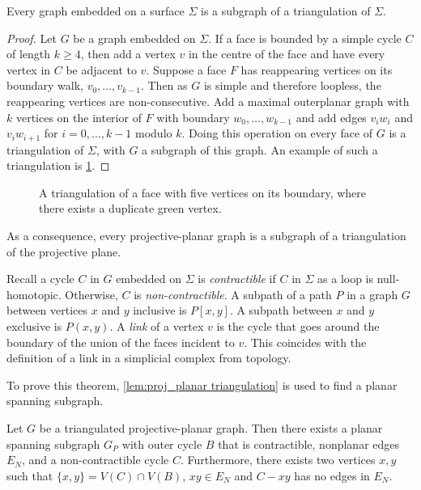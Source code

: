 \begin{theorem}\label{thm:triangulation_subgraph}
    Every graph embedded on a surface $\Sigma$ is a subgraph of a triangulation of $\Sigma$.
\end{theorem}

\begin{proof}
    Let $G$ be a graph embedded on $\Sigma$. If a face is bounded by a simple cycle $C$ of length $k \geq 4$, then add a vertex $v$ in the centre of the face and have every vertex in $C$ be adjacent to $v$. Suppose a face $F$ has reappearing vertices on its boundary walk, $v_0, \ldots, v_{k-1}$. Then as $G$ is simple and therefore loopless, the reappearing vertices are non-consecutive. Add a maximal outerplanar graph with $k$ vertices on the interior of $F$ with boundary $w_0, \ldots, w_{k-1}$ and add edges $v_i w_i$ and $v_i w_{i + 1}$ for $i = 0, \ldots, {k-1}$ modulo $k$. Doing this operation on every face of $G$ is a triangulation of $\Sigma$, with $G$ a subgraph of this graph. An example of such a triangulation is \cref{fig:triangulation}.
\end{proof}
\begin{figure}[h!]
    \centering
    
    \caption[Face triangulation]{A triangulation of a face with five vertices on its boundary, where there exists a duplicate green vertex.}\label{fig:triangulation}
\end{figure}
As a consequence, every projective-planar graph is a subgraph of a triangulation of the projective plane. 

Recall a cycle $C$ in $G$ embedded on $\Sigma$ is \textit{contractible} if $C$ in $\Sigma$ as a loop is null-homotopic. Otherwise, $C$ is \textit{ non-contractible}. A subpath of a path $P$ in a graph $G$ between vertices $x$ and $y$ inclusive is $P[x, y]$. A subpath between $x$ and $y$ exclusive is $P(x, y)$. 
A \textit{link} of a vertex $v$ is the cycle that goes around the boundary of the union of the faces incident to $v$. This coincides with the definition of a link in a simplicial complex from topology. 

To prove this theorem, \cref{lem:proj_planar triangulation} is used to find a planar spanning subgraph.

\begin{lemma}\label{lem:proj_planar triangulation}
    Let $G$ be a triangulated projective-planar graph. Then there exists a planar spanning subgraph $G_P$ with outer cycle $B$ that is contractible, nonplanar edges $E_N$, and a non-contractible cycle $C$. Furthermore, there exists two vertices $x, y$ such that $\{x, y \} = V(C) \cap V(B)$, $xy \in E_N$ and $C - xy$ has no edges in $E_N$. 
\end{lemma}

